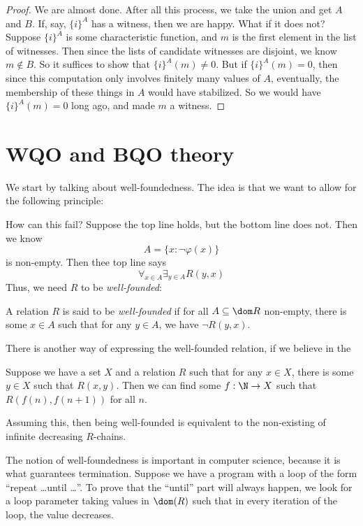 \documentclass[a4paper]{article}
\begin{document}
\begin{proof}
  We are almost done. After all this process, we take the union and get $A$ and $B$. If, say, $\{i\}^A$ has a witness, then we are happy. What if it does not? Suppose $\{i\}^A$ is some characteristic function, and $m$ is the first element in the list of witnesses. Then since the lists of candidate witnesses are disjoint, we know $m \not \in B$. So it suffices to show that $\{i\}^A(m) \not= 0$. But if $\{i\}^{A}(m) = 0$, then since this computation only involves finitely many values of $A$, eventually, the membership of these things in $A$ would have stabilized. So we would have $\{i\}^{A}(m) = 0$ long ago, and made $m$ a witness.

\end{proof}

\section{WQO and BQO theory}
We start by talking about well-foundedness. The idea is that we want to allow for the following  principle:
\begin{prooftree}
\end{prooftree}
How can this fail? Suppose the top line holds, but the bottom line does not. Then we know
\[
  A = \{x: \neg \varphi(x)\}
\]
is non-empty. Then thee top line says
\[
  \forall_{x \in A} \exists_{y \in A} R(y, x)
\]
Thus, we need $R$ to be \emph{well-founded}:
\begin{defi}
  A relation $R$ is said to be \emph{well-founded} if for all $A \subseteq \dom R$ non-empty, there is some $x \in A$ such that for any $y \in A$, we have $\neg R(y, x)$.
\end{defi}

There is another way of expressing the well-founded relation, if we believe in the 
\begin{axiom}
  Suppose we have a set $X$ and a relation $R$ such that for any $x \in X$, there is some $y \in X$ such that $R(x, y)$. Then we can find some $f: \N \to X$ such that $R(f(n), f(n + 1))$ for all $n$.
\end{axiom}
Assuming this, then being well-founded is equivalent to the non-existing of infinite decreasing $R$-chains.

The notion of well-foundedness is important in computer science, because it is what guarantees termination. Suppose we have a program with a loop of the form ``repeat \ldots until \ldots''. To prove that the ``until'' part will always happen, we look for a loop parameter taking values in $\dom(R)$ such that in every iteration of the loop, the value decreases. %
\end{document}
